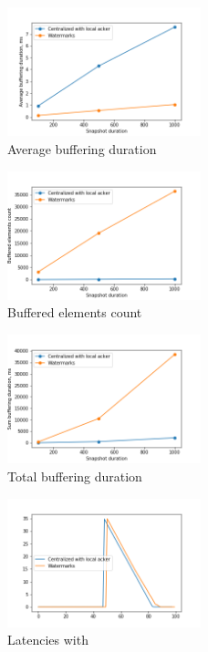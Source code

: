\begin{figure}[htbp]
  \centering
  \includegraphics[width=0.50\textwidth]{pics/buffering_average_duration.png}
  \caption{Average buffering duration}
\end{figure}
\begin{figure}[htbp]
  \centering
  \includegraphics[width=0.50\textwidth]{pics/buffering_count.png}
  \caption{Buffered elements count}
\end{figure}
\begin{figure}[htbp]
  \centering
  \includegraphics[width=0.50\textwidth]{pics/buffering_sum_duration.png}
  \caption{Total buffering duration}
\end{figure}
\begin{figure}[htbp]
  \centering
  \includegraphics[width=0.50\textwidth]{pics/buffering_latencies_evolution_acker.png}
  \caption{Latencies with \tracker}
\end{figure}
